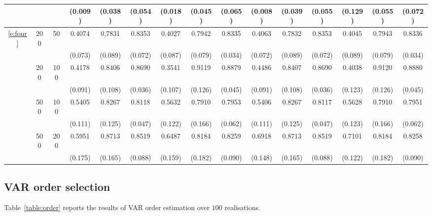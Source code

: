 \begin{table}[htb!]
{\begin{tabular}{ccc cccccc cccccc}
 &  &  & (0.009) & (0.038) & (0.054) & (0.018) & (0.045) & (0.065) & (0.008) & (0.039) & (0.055) & (0.129) & (0.055) & (0.072) \\ \midrule
\ref{e:four} & 200 & 50 & 0.4074 & 0.7831 & 0.8353 & 0.4027 & 0.7942 & 0.8335 & 0.4063 & 0.7832 & 0.8353 & 0.4045 & 0.7943 & 0.8336 \\
 &  &  & (0.073) & (0.089) & (0.072) & (0.087) & (0.079) & (0.034) & (0.072) & (0.089) & (0.072) & (0.089) & (0.079) & (0.034) \\
 & 200 & 100 & 0.4178 & 0.8406 & 0.8690 & 0.3541 & 0.9119 & 0.8879 & 0.4486 & 0.8407 & 0.8690 & 0.4038 & 0.9120 & 0.8880 \\
 &  &  & (0.091) & (0.108) & (0.036) & (0.107) & (0.126) & (0.045) & (0.091) & (0.108) & (0.036) & (0.123) & (0.126) & (0.045) \\
 & 500 & 100 & 0.5405 & 0.8267 & 0.8118 & 0.5632 & 0.7910 & 0.7953 & 0.5406 & 0.8267 & 0.8117 & 0.5628 & 0.7910 & 0.7951 \\
 &  &  & (0.111) & (0.125) & (0.047) & (0.122) & (0.166) & (0.062) & (0.111) & (0.125) & (0.047) & (0.123) & (0.166) & (0.062) \\
 & 500 & 200 & 0.5951 & 0.8713 & 0.8519 & 0.6487 & 0.8184 & 0.8259 & 0.6918 & 0.8713 & 0.8519 & 0.7101 & 0.8184 & 0.8258 \\
 &  &  & (0.175) & (0.165) & (0.088) & (0.159) & (0.182) & (0.090) & (0.148) & (0.165) & (0.088) & (0.122) & (0.182) & (0.090) \\ \bottomrule
\end{tabular} }
\end{table}

\subsection{VAR order selection}

Table~\ref{table:order} reports the results of VAR order estimation over $100$ realisations.

